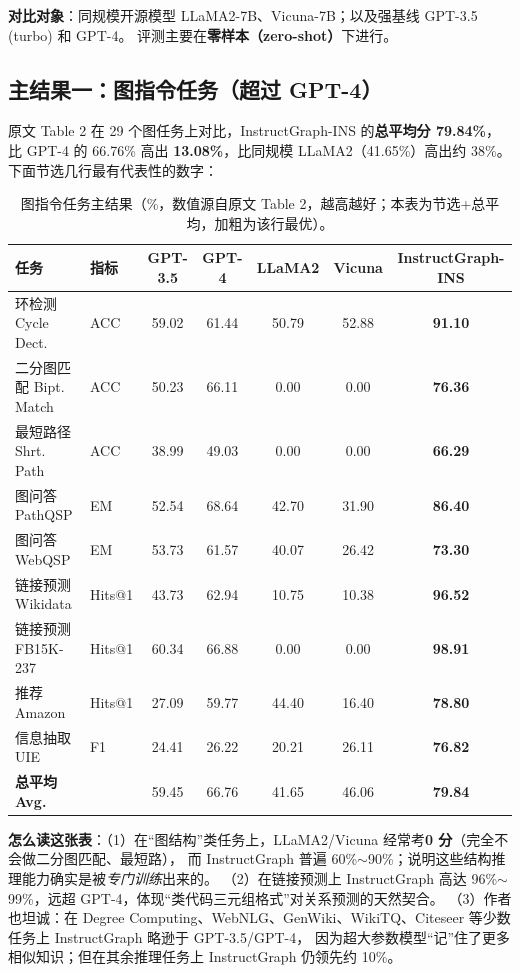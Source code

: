 \documentclass[11pt,UTF8,fontset=fandol]{ctexart}
\begin{document}
\textbf{对比对象}：同规模开源模型 LLaMA2-7B、Vicuna-7B；以及强基线 GPT-3.5 (turbo) 和 GPT-4。
评测主要在\textbf{零样本（zero-shot）}下进行。

\subsection{主结果一：图指令任务（超过 GPT-4）}
原文 Table 2 在 29 个图任务上对比，InstructGraph-INS 的\textbf{总平均分 79.84\%}，
比 GPT-4 的 66.76\% 高出 \textbf{13.08\%}，比同规模 LLaMA2（41.65\%）高出约 38\%。下面节选几行最有代表性的数字：

\begin{table}[H]\centering
\caption{图指令任务主结果（\%，数值源自原文 Table 2，越高越好；本表为节选+总平均，加粗为该行最优）。}
\begin{tabular}{llccccc}
\toprule
任务 & 指标 & GPT-3.5 & GPT-4 & LLaMA2 & Vicuna & \textbf{InstructGraph-INS} \\
\midrule
环检测 Cycle Dect. & ACC & 59.02 & 61.44 & 50.79 & 52.88 & \textbf{91.10} \\
二分图匹配 Bipt. Match & ACC & 50.23 & 66.11 & 0.00 & 0.00 & \textbf{76.36} \\
最短路径 Shrt. Path & ACC & 38.99 & 49.03 & 0.00 & 0.00 & \textbf{66.29} \\
图问答 PathQSP & EM & 52.54 & 68.64 & 42.70 & 31.90 & \textbf{86.40} \\
图问答 WebQSP & EM & 53.73 & 61.57 & 40.07 & 26.42 & \textbf{73.30} \\
链接预测 Wikidata & Hits@1 & 43.73 & 62.94 & 10.75 & 10.38 & \textbf{96.52} \\
链接预测 FB15K-237 & Hits@1 & 60.34 & 66.88 & 0.00 & 0.00 & \textbf{98.91} \\
推荐 Amazon & Hits@1 & 27.09 & 59.77 & 44.40 & 16.40 & \textbf{78.80} \\
信息抽取 UIE & F1 & 24.41 & 26.22 & 20.21 & 26.11 & \textbf{76.82} \\
\midrule
\textbf{总平均 Avg.} & & 59.45 & 66.76 & 41.65 & 46.06 & \textbf{79.84} \\
\bottomrule
\end{tabular}
\end{table}

\textbf{怎么读这张表}：（1）在“图结构”类任务上，LLaMA2/Vicuna 经常考\textbf{0 分}（完全不会做二分图匹配、最短路），
而 InstructGraph 普遍 60\%$\sim$90\%；说明这些结构推理能力确实是被\emph{专门训练}出来的。
（2）在链接预测上 InstructGraph 高达 96\%$\sim$99\%，远超 GPT-4，体现“类代码三元组格式”对关系预测的天然契合。
（3）作者也坦诚：在 Degree Computing、WebNLG、GenWiki、WikiTQ、Citeseer 等少数任务上 InstructGraph 略逊于 GPT-3.5/GPT-4，
因为超大参数模型“记”住了更多相似知识；但在其余推理任务上 InstructGraph 仍领先约 10\%。
\end{document}
